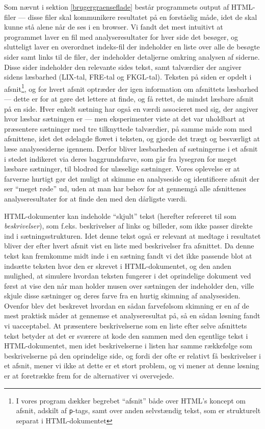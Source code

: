 \documentclass[a4paper,oneside,article]{memoir}
\begin{document}
Som nævnt i sektion \ref{brugergraenseflade} består programmets output
af HTML-filer --- disse filer skal kommunikere resultatet på en
forståelig måde, idet de skal kunne stå alene når de ses i en
browser. Vi fandt det mest intuitivt at programmet laver en fil med
analyseresultater for hver side det besøger, og slutteligt laver en
overordnet indeks-fil der indeholder en liste over alle de besøgte
sider samt links til de filer, der indeholder detaljerne omkring
analysen af siderne. Disse sider indeholder den relevante sides tekst,
samt talværdier der angiver sidens læsbarhed (LIX-tal, FRE-tal og
FKGL-tal). Teksten på siden er opdelt i afsnit\footnote{I vores
  program dækker begrebet ``afsnit'' både over HTML's koncept om
  afsnit, adskilt af \texttt{p}-tags, samt over anden selvstændig
  tekst, som er strukturelt separat i HTML-dokumentet}, og for hvert
afsnit optræder der igen information om afsnittets læsbarhed --- dette
er for at gøre det lettere at finde, og få rettet, de mindst læsbare
afsnit på en side. Hver enkelt sætning har også en værdi associeret
med sig, der angiver hvor læsbar sætningen er --- men eksperimenter
viste at det var uholdbart at præsentere sætninger med tre tilknyttede
talværdier, på samme måde som med afsnittene, idet det ødelagde flowet
i teksten, og gjorde det trægt og besværligt at læse analysesiderne
igennem. Derfor bliver læsbarheden af sætningerne i et afsnit i stedet
indikeret via deres baggrundsfarve, som går fra lysegrøn for meget
læsbare sætninger, til blodrød for ulæselige sætninger. Vores
oplevelse er at farverne hurtigt gør det muligt at skimme en
analyseside og identificere afsnit der ser ``meget røde'' ud, uden at
man har behov for at gennemgå alle afsnittenes analyseresultater for
at finde den med den dårligste værdi.

HTML-dokumenter kan indeholde ``skjult'' tekst (herefter refereret til
som \textit{beskrivelser}), som f.eks. beskrivelser af links og
billeder, som ikke passer direkte ind i sætningsstrukturen. Idet denne
tekst også er relevant at medtage i resultatet bliver der efter hvert
afsnit vist en liste med beskrivelser fra afsnittet. Da denne tekst
kan fremkomme midt inde i en sætning fandt vi det ikke passende blot
at indsætte teksten hvor den er skrevet i HTML-dokumentet, og den
anden mulighed, at simulere hvordan teksten fungerer i det oprindelige
dokument ved først at vise den når man holder musen over sætningen der
indeholder den, ville skjule disse sætninger og deres farve fra en
hurtig skimning af analysesiden. Ovenfor blev det beskrevet hvordan en
sådan farvefølsom skimning er en af de mest praktisk måder at gennemse
et analyseresultat på, så en sådan løsning fandt vi uacceptabel. At
præsentere beskrivelserne som en liste efter selve afsnittets tekst
betyder at det er sværere at kode den sammen med den egentlige tekst i
HTML-dokumentet, men idet beskrivelserne i listen har samme rækkefølge
som beskrivelserne på den oprindelige side, og fordi der ofte er
relativt få beskrivelser i et afsnit, mener vi ikke at dette er et
stort problem, og vi mener at denne løsning er at foretrække frem for
de alternativer vi overvejede.
\end{document}
